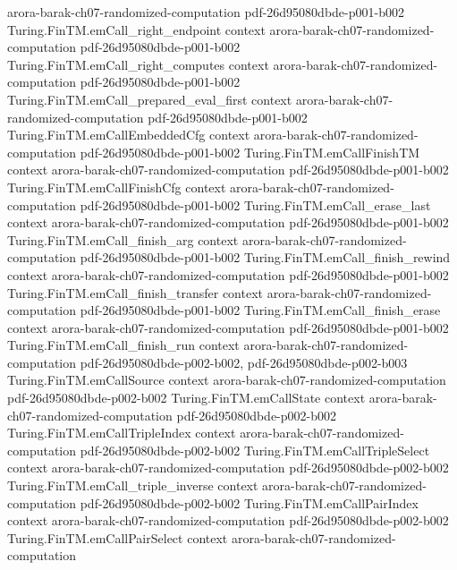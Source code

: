 \begin{theorem}
  {arora-barak-ch07-randomized-computation}
  {pdf-26d95080dbde-p001-b002}
\proofstep
  {Turing.FinTM.emCall_right_endpoint}
  {context}
  {arora-barak-ch07-randomized-computation}
  {pdf-26d95080dbde-p001-b002}
\proofstep
  {Turing.FinTM.emCall_right_computes}
  {context}
  {arora-barak-ch07-randomized-computation}
  {pdf-26d95080dbde-p001-b002}
\proofstep
  {Turing.FinTM.emCall_prepared_eval_first}
  {context}
  {arora-barak-ch07-randomized-computation}
  {pdf-26d95080dbde-p001-b002}
\proofstep
  {Turing.FinTM.emCallEmbeddedCfg}
  {context}
  {arora-barak-ch07-randomized-computation}
  {pdf-26d95080dbde-p001-b002}
\proofstep
  {Turing.FinTM.emCallFinishTM}
  {context}
  {arora-barak-ch07-randomized-computation}
  {pdf-26d95080dbde-p001-b002}
\proofstep
  {Turing.FinTM.emCallFinishCfg}
  {context}
  {arora-barak-ch07-randomized-computation}
  {pdf-26d95080dbde-p001-b002}
\proofstep
  {Turing.FinTM.emCall_erase_last}
  {context}
  {arora-barak-ch07-randomized-computation}
  {pdf-26d95080dbde-p001-b002}
\proofstep
  {Turing.FinTM.emCall_finish_arg}
  {context}
  {arora-barak-ch07-randomized-computation}
  {pdf-26d95080dbde-p001-b002}
\proofstep
  {Turing.FinTM.emCall_finish_rewind}
  {context}
  {arora-barak-ch07-randomized-computation}
  {pdf-26d95080dbde-p001-b002}
\proofstep
  {Turing.FinTM.emCall_finish_transfer}
  {context}
  {arora-barak-ch07-randomized-computation}
  {pdf-26d95080dbde-p001-b002}
\proofstep
  {Turing.FinTM.emCall_finish_erase}
  {context}
  {arora-barak-ch07-randomized-computation}
  {pdf-26d95080dbde-p001-b002}
\proofstep
  {Turing.FinTM.emCall_finish_run}
  {context}
  {arora-barak-ch07-randomized-computation}
  {pdf-26d95080dbde-p002-b002,
    pdf-26d95080dbde-p002-b003}
\proofstep
  {Turing.FinTM.emCallSource}
  {context}
  {arora-barak-ch07-randomized-computation}
  {pdf-26d95080dbde-p002-b002}
\proofstep
  {Turing.FinTM.emCallState}
  {context}
  {arora-barak-ch07-randomized-computation}
  {pdf-26d95080dbde-p002-b002}
\proofstep
  {Turing.FinTM.emCallTripleIndex}
  {context}
  {arora-barak-ch07-randomized-computation}
  {pdf-26d95080dbde-p002-b002}
\proofstep
  {Turing.FinTM.emCallTripleSelect}
  {context}
  {arora-barak-ch07-randomized-computation}
  {pdf-26d95080dbde-p002-b002}
\proofstep
  {Turing.FinTM.emCall_triple_inverse}
  {context}
  {arora-barak-ch07-randomized-computation}
  {pdf-26d95080dbde-p002-b002}
\proofstep
  {Turing.FinTM.emCallPairIndex}
  {context}
  {arora-barak-ch07-randomized-computation}
  {pdf-26d95080dbde-p002-b002}
\proofstep
  {Turing.FinTM.emCallPairSelect}
  {context}
  {arora-barak-ch07-randomized-computation}

\end{theorem}
